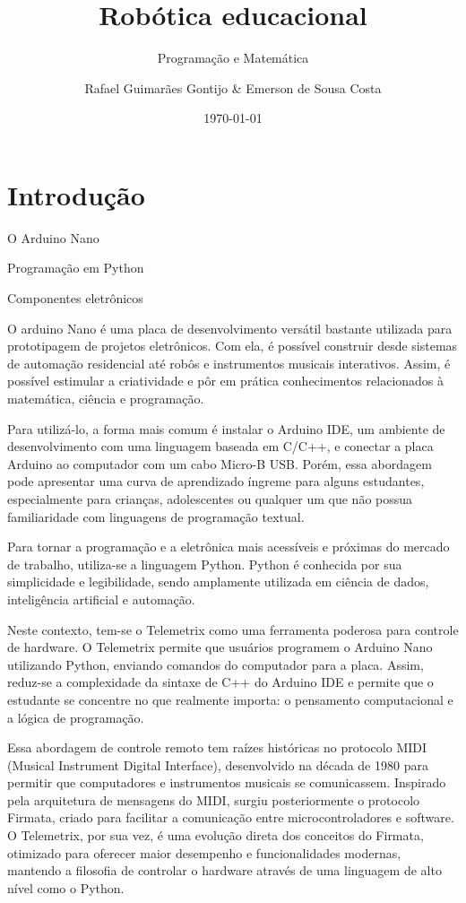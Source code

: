 \documentclass[lang=pt,11pt]{elegantbook}
\title{Robótica educacional}
\subtitle{Programação e Matemática}
\author{Rafael Guimarães Gontijo \& Emerson de Sousa Costa}
\institute{CEFET-MG}
\date{\today}
\begin{document}
\maketitle

\frontmatter
\tableofcontents

\mainmatter

\chapter{Introdução}

\begin{introduction}
  \item O Arduino Nano
  \item Programação em Python
  \item Componentes eletrônicos
\end{introduction}

O arduino Nano é uma placa de desenvolvimento versátil bastante utilizada para prototipagem de projetos eletrônicos. Com ela, é possível construir desde sistemas de automação residencial até robôs e instrumentos musicais interativos. Assim, é possível estimular a criatividade e pôr em prática conhecimentos relacionados à matemática, ciência e programação.

Para utilizá-lo, a forma mais comum é instalar o Arduino IDE, um ambiente de desenvolvimento com uma linguagem baseada em C/C++, e conectar a placa Arduino ao computador com um cabo Micro-B USB. Porém, essa abordagem pode apresentar uma curva de aprendizado íngreme para alguns estudantes, especialmente para crianças, adolescentes ou qualquer um que não possua familiaridade com linguagens de programação textual.

Para tornar a programação e a eletrônica mais acessíveis e próximas do mercado de trabalho, utiliza-se a linguagem Python. Python é conhecida por sua simplicidade e legibilidade, sendo amplamente utilizada em ciência de dados, inteligência artificial e automação.

Neste contexto, tem-se o Telemetrix como uma ferramenta poderosa para controle de hardware. O Telemetrix permite que usuários programem o Arduino Nano utilizando Python, enviando comandos do computador para a placa. Assim, reduz-se a complexidade da sintaxe de C++ do Arduino IDE e permite que o estudante se concentre no que realmente importa: o pensamento computacional e a lógica de programação.

Essa abordagem de controle remoto tem raízes históricas no protocolo MIDI (Musical Instrument Digital Interface), desenvolvido na década de 1980 para permitir que computadores e instrumentos musicais se comunicassem. Inspirado pela arquitetura de mensagens do MIDI, surgiu posteriormente o protocolo Firmata, criado para facilitar a comunicação entre microcontroladores e software. O Telemetrix, por sua vez, é uma evolução direta dos conceitos do Firmata, otimizado para oferecer maior desempenho e funcionalidades modernas, mantendo a filosofia de controlar o hardware através de uma linguagem de alto nível como o Python.
\end{document}
